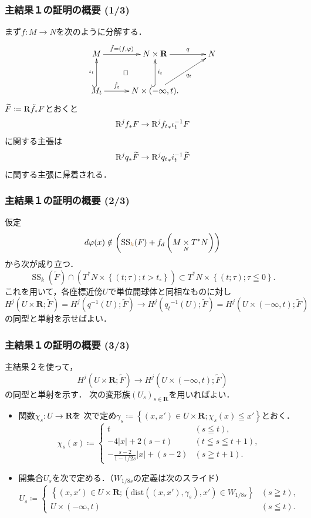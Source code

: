 \documentclass[dvipdfmx,10pt,aspectratio=169,leqno]{beamer}%
\newcommand{\rr}{\mathbf{R}}
\numberwithin{equation}{subsection}
\newcommand{\muS}[1][]{\mathop{\mathrm{SS}}\nolimits_{#1}}
\newcommand{\Rder}[1][]{\mathop{\mathrm{R}^{#1}\hspace{-2pt}}\nolimits}
\newcommand{\mdiff}[1][]{{#1}_{d}} %
\newcommand{\pb}[1][]{\mathbin{\mathop{\times}\limits_{#1}}}
\newcommand{\cotb}[1][]{T^{\ast}{#1}}
\theoremstyle{mystyle}
\newcommand{\smid}{\mathrel{;}}
\begin{document}
\begin{frame}
  \frametitle{主結果１の証明の概要 (1/3)}
  まず\(f\colon M\to N\)を次のように分解する．
  \[
    \xymatrix@C=30pt@R=30pt{
    M
      \ar[r]^-{\tilde{f}=(f,\varphi)}
      \ar@{}[rd]|\square
    &
    N\times\rr
      \ar[r]^-{q}
    &
    N\\
    M_{t}
      \ar@{^(->}[u]^-{\iota_t}
      \ar[r]^-{\hat{f}_{t}}
    &
    N\times (-\infty,t). 
      \ar@{^(->}[u]_-{i_{t}}
      \ar[ur]_-{q_{t}}
    &
  }
  \]
  \(\widetilde{F}\coloneqq \Rder[]\tilde{f}_{\ast}F\)とおくと
  \[
    \Rder[j]{f_{\ast}}F
    \to
    \Rder[j]{{f_{t}}_{\ast}}\iota^{-1}_{t}F
  \]
  に関する主張は
  \[
    \Rder[j]{q_{\ast}}\widetilde{F}
    \to
    \Rder[j]{{q_{t}}_{\ast}}i^{-1}_{t}\widetilde{F}
  \]  
  に関する主張に帰着される．
\end{frame}
\begin{frame}
  \frametitle{主結果１の証明の概要 (2/3)}
  仮定\[
        d\varphi(x)\notin \left(
          \muS[\textcolor{brown}{k}](F)+ \mdiff[f]\left(
            M\pb[N]\cotb[N]
          \right)
        \right)
  \]から次が成り立つ．
  \[
    \muS[k](\widetilde{F})\cap\left(
      \cotb[N]\times\left\{(t;\tau);t>t_{\circ}\right\}
    \right)
    \subset
    \cotb[N]\times\left\{(t;\tau);\tau\leqq0\right\}.
  \]\pause
  これを用いて，各座標近傍\(U\)で単位開球体と同相なものに対し
  \[
    H^{j}(U\times\rr;\widetilde{F})=H^{j}(q^{-1}(U);\widetilde{F})
    \to
    H^{j}({q_{t}}^{-1}(U);\widetilde{F})
    =H^{j}(U\times(-\infty,t);\widetilde{F})
  \]
  の同型と単射を示せばよい．
\end{frame}
\begin{frame}
  \frametitle{主結果１の証明の概要 (3/3)}
  主結果２を使って，
  \[
    H^{j}(U\times\rr;\widetilde{F})
    \to
    H^{j}(U\times(-\infty,t);\widetilde{F})
  \]
  の同型と単射を示す．
  次の変形族\((U_{s})_{s\in\rr}\)を用いればよい．\pause
  \begin{itemize}
    \item 関数\(\chi_{s}\colon U\to \rr\)を
    次で定め\(\gamma_{s}\coloneqq\left\{
      (x,x')\in U\times \rr \smid \chi_{s}(x)\leqq x'
    \right\}\)とおく．\[
      \chi_{s}(x)\coloneqq
      \begin{cases}
        t & (s\leqq t),\\
        -4\left|x\right|+2(s-t)& (t\leqq s\leqq t+1),\\
        -\frac{s-2}{1-1/2s}\left|x\right|+(s-2)& (s\geqq t+1).
      \end{cases}
    \]\pause
    \item 開集合\(U_{s}\)を次で定める．（\(W_{1/8s}\)の定義は次のスライド）
    \[
      U_{s}\coloneqq \begin{cases}
        \left\{(x,x')\in U\times \rr \smid 
          (\mathrm{dist}((x,x'),\gamma_{s}),x')\in W_{1/8s}
        \right\}& (s\geqq t),\\
        U\times (-\infty,t) &(s\leqq t).
      \end{cases}
    \]
  \end{itemize}
\end{frame}
\end{document}
